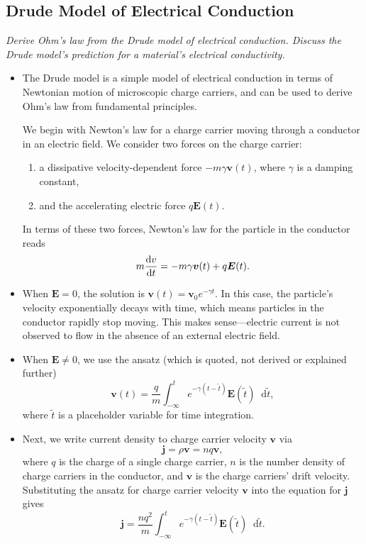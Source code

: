 \documentclass[11pt, a4paper]{article}
\newcommand{\diff}{\mathop{}\!\mathrm{d}} %
\renewcommand{\vec}[1]{\bm{#1}} %
\renewcommand{\t}[1]{\tilde{#1}} %
\newcommand{\E}{\vec{E}} %
\renewcommand{\j}{\vec{j}}  %
\begin{document}
\subsection{Drude Model of Electrical Conduction}
\textit{Derive Ohm's law from the Drude model of electrical conduction. Discuss the Drude model's prediction for a material's electrical conductivity. }

\begin{itemize}
	\item The Drude model is a simple model of electrical conduction in terms of Newtonian motion of microscopic charge carriers, and can be used to derive Ohm's law from fundamental principles.
	
	We begin with Newton's law for a charge carrier moving through a conductor in an electric field. We consider two forces on the charge carrier:
	\begin{enumerate}
		\item a dissipative velocity-dependent force $ - m \gamma \vec{v}(t) $, where $ \gamma $ is a damping constant,
		
		\item and the accelerating electric force $ q \E(t) $.
	\end{enumerate}
	In terms of these two forces, Newton's law for the particle in the conductor reads
	\begin{equation*}
		m \dv{v}{t} = - m \gamma \vec{v}(t) + q \E(t).
	\end{equation*}
	
	\item When $ \E = 0 $, the solution is $ \vec{v}(t) = \vec{v}_{0} e^{- \gamma t}$. In this case, the particle's velocity exponentially decays with time, which means particles in the conductor rapidly stop moving. This makes sense---electric current is not observed to flow in the absence of an external electric field.
	
	\item When $ \E \neq 0 $, we use the ansatz (which is quoted, not derived or explained further)
	\begin{equation*}
		\vec{v}(t) = \frac{q}{m}\int_{-\infty}^{t}e^{-\gamma(t - \t{t})}\E(\t{t}) \diff \t{t},
	\end{equation*}
    where $ \tilde{t} $ is a placeholder variable for time integration.
	
    \item Next, we write current density to charge carrier velocity $ \vec{v} $ via
	\begin{equation*}
		\j = \rho \vec{v} = n q \vec{v},
	\end{equation*}
	where $ q $ is the charge of a single charge carrier, $ n $ is the number density of charge carriers in the conductor, and $ \vec{v} $ is the charge carriers' drift velocity. Substituting the ansatz for charge carrier velocity $ \vec{v} $ into the equation for $ \j $ gives
	\begin{equation*}
		\j = \frac{nq^{2}}{m}\int_{-\infty}^{t}e^{-\gamma(t - \t{t})}\E(\t{t}) \diff \t{t}.
	\end{equation*}
	

\end{itemize}
\end{document}
